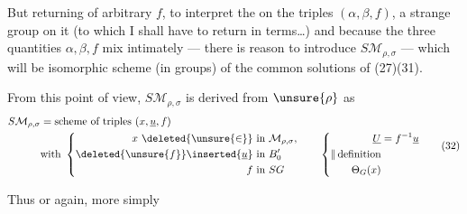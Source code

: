 But returning  of arbitrary $f$, to interpret the   on the triples $(\alpha,\beta,f)$,   a strange group on it  (to which I shall have to return in   terms\ldots) and because the three quantities $\alpha,\beta,f$ mix intimately --- there is reason to introduce $S\mathcal M_{\rho,\sigma}$ --- which will be isomorphic  scheme (in groups) of the common solutions of (27)(31).

From this point of view, $S\mathcal M_{\rho,\sigma}$ is derived from $\unsure{\rho}$ as  
\[
\begin{aligned}
S\mathcal M_{\rho,\sigma}&=\text{scheme of triples }(x,\underline u,f)\\
&\text{with }\left\{
\begin{aligned}
x\ \deleted{\unsure{\in}}&\text{ in }\mathcal M_{\rho,\sigma},\\
\deleted{\unsure{f}}\inserted{\underline u}&\text{ in }B'_0\\
f&\text{ in }SG
\end{aligned}
\right.
\qquad\left\{
\begin{aligned}
\underline U&=f^{-1}\underline u\\
\Vert\,\text{definition}&\\
\Theta_G(x)&
\end{aligned}\right.
\end{aligned}\tag{32}
\]

Thus
or again, more simply

